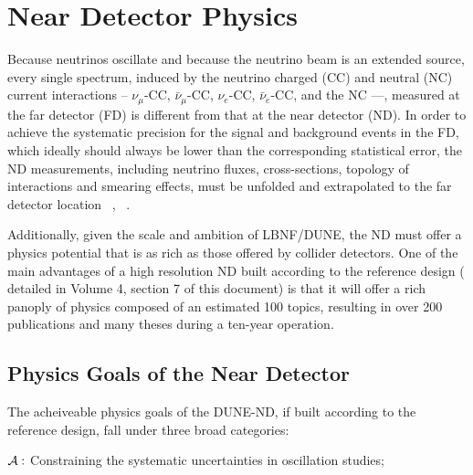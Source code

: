 
\chapter{Near Detector Physics}
\label{ch:physics-nd}

Because neutrinos oscillate and because the neutrino beam is an extended  source, every single 
spectrum,  induced by the neutrino charged (CC) and neutral (NC) current interactions -- $\nu_\mu$-CC, 
$\bar \nu_\mu$-CC, $\nu_e$-CC, $\bar \nu_e$-CC, and the NC ---, measured at the far detector (FD)  is different from that at the near 
detector (ND). 
In order to achieve the systematic precision for the signal and background events  in the FD,  
which ideally should always be lower than the corresponding statistical error, the ND 
measurements,  including neutrino fluxes,  cross-sections, topology of 
interactions and smearing effects, must be unfolded and extrapolated to the far detector location 
~\cite{ND-REQ1}, ~\cite{ND-REQ2}. 


Additionally, given the scale and ambition of LBNF/DUNE, the ND must offer a physics 
potential that is as rich as those offered by collider detectors. One of the main advantages 
of a high resolution ND built according to the reference design ( detailed in Volume 4, section 7 of  this document) is that it will offer a rich panoply of physics composed 
of an estimated 100 topics,  resulting in over 200 publications and many theses during 
a ten-year operation. 


\section{Physics Goals of the Near Detector}
\label{sec:physics-nd-goals}

The acheiveable physics goals of the DUNE-ND, if built according to the reference design,  fall under three broad categories: 

\noindent
{\boldmath $ {\cal A:}$} Constraining the systematic uncertainties in  oscillation studies;  


